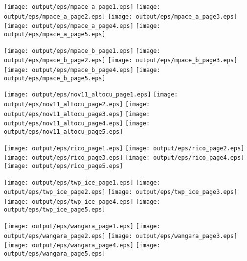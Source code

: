 \documentclass[11pt]{article}
\begin{document}
\begin{center}

\texttt{[image: output/eps/mpace\_a\_page1.eps]}
\texttt{[image: output/eps/mpace\_a\_page2.eps]}
\texttt{[image: output/eps/mpace\_a\_page3.eps]}
\texttt{[image: output/eps/mpace\_a\_page4.eps]}
\texttt{[image: output/eps/mpace\_a\_page5.eps]}
\end{center}
\newpage

\begin{center}

\texttt{[image: output/eps/mpace\_b\_page1.eps]}
\texttt{[image: output/eps/mpace\_b\_page2.eps]}
\texttt{[image: output/eps/mpace\_b\_page3.eps]}
\texttt{[image: output/eps/mpace\_b\_page4.eps]}
\texttt{[image: output/eps/mpace\_b\_page5.eps]}
\end{center}
\newpage

\begin{center}

\texttt{[image: output/eps/nov11\_altocu\_page1.eps]}
\texttt{[image: output/eps/nov11\_altocu\_page2.eps]}
\texttt{[image: output/eps/nov11\_altocu\_page3.eps]}
\texttt{[image: output/eps/nov11\_altocu\_page4.eps]}
\texttt{[image: output/eps/nov11\_altocu\_page5.eps]}
\end{center}
\newpage

\begin{center}

\texttt{[image: output/eps/rico\_page1.eps]}
\texttt{[image: output/eps/rico\_page2.eps]}
\texttt{[image: output/eps/rico\_page3.eps]}
\texttt{[image: output/eps/rico\_page4.eps]}
\texttt{[image: output/eps/rico\_page5.eps]}
\end{center}
\newpage

\begin{center}

\texttt{[image: output/eps/twp\_ice\_page1.eps]}
\texttt{[image: output/eps/twp\_ice\_page2.eps]}
\texttt{[image: output/eps/twp\_ice\_page3.eps]}
\texttt{[image: output/eps/twp\_ice\_page4.eps]}
\texttt{[image: output/eps/twp\_ice\_page5.eps]}
\end{center}
\newpage

\begin{center}

\texttt{[image: output/eps/wangara\_page1.eps]}
\texttt{[image: output/eps/wangara\_page2.eps]}
\texttt{[image: output/eps/wangara\_page3.eps]}
\texttt{[image: output/eps/wangara\_page4.eps]}
\texttt{[image: output/eps/wangara\_page5.eps]}
\end{center}
\newpage
\end{document}
